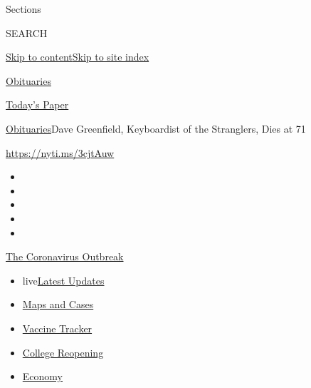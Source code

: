 Sections

SEARCH

\protect\hyperlink{site-content}{Skip to
content}\protect\hyperlink{site-index}{Skip to site index}

\href{https://www.nytimes3xbfgragh.onion/section/obituaries}{Obituaries}

\href{https://myaccount.nytimes3xbfgragh.onion/auth/login?response_type=cookie\&client_id=vi}{}

\href{https://www.nytimes3xbfgragh.onion/section/todayspaper}{Today's
Paper}

\href{/section/obituaries}{Obituaries}\textbar{}Dave Greenfield,
Keyboardist of the Stranglers, Dies at 71

\url{https://nyti.ms/3cjtAuw}

\begin{itemize}
\item
\item
\item
\item
\item
\end{itemize}

\href{https://www.nytimes3xbfgragh.onion/news-event/coronavirus?action=click\&pgtype=Article\&state=default\&region=TOP_BANNER\&context=storylines_menu}{The
Coronavirus Outbreak}

\begin{itemize}
\tightlist
\item
  live\href{https://www.nytimes3xbfgragh.onion/2020/08/04/world/coronavirus-covid-19.html?action=click\&pgtype=Article\&state=default\&region=TOP_BANNER\&context=storylines_menu}{Latest
  Updates}
\item
  \href{https://www.nytimes3xbfgragh.onion/interactive/2020/us/coronavirus-us-cases.html?action=click\&pgtype=Article\&state=default\&region=TOP_BANNER\&context=storylines_menu}{Maps
  and Cases}
\item
  \href{https://www.nytimes3xbfgragh.onion/interactive/2020/science/coronavirus-vaccine-tracker.html?action=click\&pgtype=Article\&state=default\&region=TOP_BANNER\&context=storylines_menu}{Vaccine
  Tracker}
\item
  \href{https://www.nytimes3xbfgragh.onion/2020/08/02/us/covid-college-reopening.html?action=click\&pgtype=Article\&state=default\&region=TOP_BANNER\&context=storylines_menu}{College
  Reopening}
\item
  \href{https://www.nytimes3xbfgragh.onion/live/2020/08/03/business/stock-market-today-coronavirus?action=click\&pgtype=Article\&state=default\&region=TOP_BANNER\&context=storylines_menu}{Economy}
\end{itemize}

